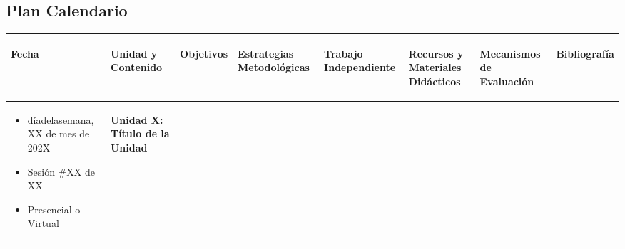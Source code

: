 \begin{landscape}

    \section{Plan Calendario}

    \small
    \begin{xltabular}{\linewidth}{@{}XXXXXXXX@{}}
        \toprule
        \begin{center}\textbf{Fecha}\end{center} & \begin{center}\textbf{Unidad y Contenido}\end{center} & \begin{center}\textbf{Objetivos}\end{center} & \begin{center}\textbf{Estrategias Metodológicas}\end{center} & \begin{center}\textbf{Trabajo Independiente}\end{center} & \begin{center}\textbf{Recursos y Materiales Didácticos}\end{center} & \begin{center}\textbf{Mecanismos de Evaluación}\end{center} & \begin{center}\textbf{Bibliografía}\end{center} \\
        \midrule
        \begin{itemize}[label={}, labelsep=0pt, left=0pt .. 0pt, itemsep=1em] %
            \item díadelasemana, XX de mes de 202X
            \item Sesión \#XX de XX
            \item Presencial o Virtual
        \end{itemize} &
        \vspace{.01em}
        \textbf{Unidad X: Título de la Unidad} %
        \vspace{.6em}
        \begin{itemize}[labelsep=2pt, itemsep=0.6em] %

\end{itemize}
\end{xltabular}
\end{landscape}
